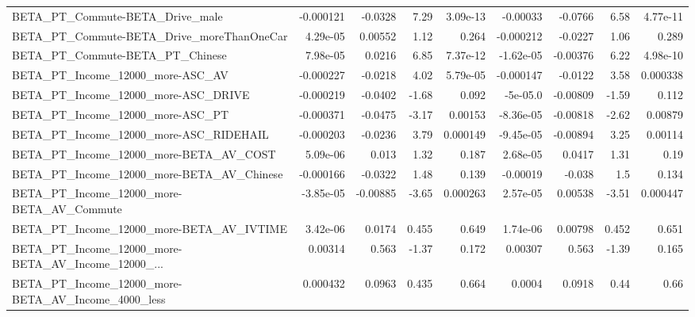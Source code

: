 \begin{tabular}{lrrrrrrrr}
BETA\_PT\_Commute-BETA\_Drive\_male                    &   -0.000121 &      -0.0328 &     7.29 & 3.09e-13 &   -0.00033 &     -0.0766 &         6.58 &      4.77e-11 \\
BETA\_PT\_Commute-BETA\_Drive\_moreThanOneCar          &    4.29e-05 &      0.00552 &     1.12 &    0.264 &  -0.000212 &     -0.0227 &         1.06 &         0.289 \\
BETA\_PT\_Commute-BETA\_PT\_Chinese                    &    7.98e-05 &       0.0216 &     6.85 & 7.37e-12 &  -1.62e-05 &    -0.00376 &         6.22 &      4.98e-10 \\
BETA\_PT\_Income\_12000\_more-ASC\_AV                   &   -0.000227 &      -0.0218 &     4.02 & 5.79e-05 &  -0.000147 &     -0.0122 &         3.58 &      0.000338 \\
BETA\_PT\_Income\_12000\_more-ASC\_DRIVE                &   -0.000219 &      -0.0402 &    -1.68 &    0.092 &   -5e-05.0 &    -0.00809 &        -1.59 &         0.112 \\
BETA\_PT\_Income\_12000\_more-ASC\_PT                   &   -0.000371 &      -0.0475 &    -3.17 &  0.00153 &  -8.36e-05 &    -0.00818 &        -2.62 &       0.00879 \\
BETA\_PT\_Income\_12000\_more-ASC\_RIDEHAIL             &   -0.000203 &      -0.0236 &     3.79 & 0.000149 &  -9.45e-05 &    -0.00894 &         3.25 &       0.00114 \\
BETA\_PT\_Income\_12000\_more-BETA\_AV\_COST             &    5.09e-06 &        0.013 &     1.32 &    0.187 &   2.68e-05 &      0.0417 &         1.31 &          0.19 \\
BETA\_PT\_Income\_12000\_more-BETA\_AV\_Chinese          &   -0.000166 &      -0.0322 &     1.48 &    0.139 &   -0.00019 &      -0.038 &          1.5 &         0.134 \\
BETA\_PT\_Income\_12000\_more-BETA\_AV\_Commute          &   -3.85e-05 &     -0.00885 &    -3.65 & 0.000263 &   2.57e-05 &     0.00538 &        -3.51 &      0.000447 \\
BETA\_PT\_Income\_12000\_more-BETA\_AV\_IVTIME           &    3.42e-06 &       0.0174 &    0.455 &    0.649 &   1.74e-06 &     0.00798 &        0.452 &         0.651 \\
BETA\_PT\_Income\_12000\_more-BETA\_AV\_Income\_12000\_... &     0.00314 &        0.563 &    -1.37 &    0.172 &    0.00307 &       0.563 &        -1.39 &         0.165 \\
BETA\_PT\_Income\_12000\_more-BETA\_AV\_Income\_4000\_less &    0.000432 &       0.0963 &    0.435 &    0.664 &     0.0004 &      0.0918 &         0.44 &          0.66 \\

\end{tabular}
